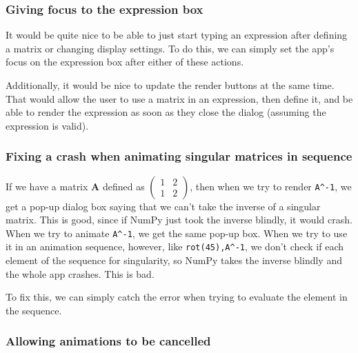 \documentclass[../development.tex]{subfiles}
\begin{document}
\subsubsection{Giving focus to the expression box\label{development:fixing-bugs-and-adding-polish:giving-focus-to-the-expression-box}}

It would be quite nice to be able to just start typing an expression after defining a matrix or changing display settings. To do this, we can simply set the app's focus on the expression box after either of these actions.

Additionally, it would be nice to update the render buttons at the same time. That would allow the user to use a matrix in an expression, then define it, and be able to render the expression as soon as they close the dialog (assuming the expression is valid).


\subsubsection{Fixing a crash when animating singular matrices in sequence\label{development:fixing-bugs-and-adding-polish:fixing-a-crash-when-animating-singular-matrices-in-sequence}}

If we have a matrix $\mathbf{A}$ defined as $\begin{pmatrix}1 & 2\\ 1 & 2\end{pmatrix}$, then when we try to render \texttt{A\^{}-1}, we get a pop-up dialog box saying that we can't take the inverse of a singular matrix. This is good, since if NumPy just took the inverse blindly, it would crash. When we try to animate \texttt{A\^{}-1}, we get the same pop-up box. When we try to use it in an animation sequence, however, like \texttt{rot(45),A\^{}-1}, we don't check if each element of the sequence for singularity, so NumPy takes the inverse blindly and the whole app crashes. This is bad.

To fix this, we can simply catch the error when trying to evaluate the element in the sequence.


\subsubsection{Allowing animations to be cancelled\label{development:fixing-bugs-and-adding-polish:allowing-animations-to-be-cancelled}}
\end{document}
